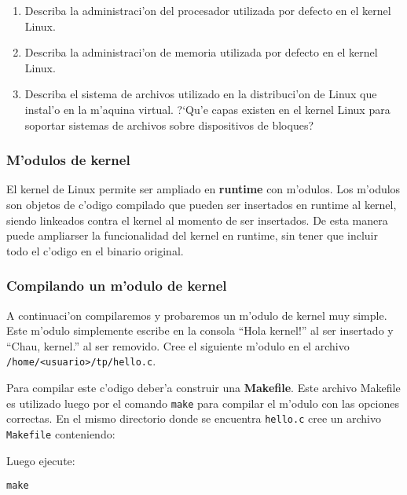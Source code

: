 \begin{enumerate}

\item Describa la administraci'on del procesador utilizada por defecto en el kernel Linux.

\item Describa la administraci'on de memoria utilizada por defecto en el kernel Linux.

\item Describa el sistema de archivos utilizado en la distribuci'on de Linux que instal'o en la m'aquina virtual.
?`Qu'e capas existen en el kernel Linux para soportar sistemas de archivos sobre dispositivos de bloques?

\end{enumerate}

\subsubsection{M'odulos de kernel}

El kernel de Linux permite ser ampliado en \textbf{runtime} con m'odulos. Los m'odulos son objetos de c'odigo compilado
que pueden ser insertados en runtime al kernel, siendo linkeados contra el kernel al momento de ser insertados. De esta
manera puede ampliarser la funcionalidad del kernel en runtime, sin tener que incluir todo el c'odigo en el binario
original.

\subsubsection{Compilando un m'odulo de kernel}

A continuaci'on compilaremos y probaremos un m'odulo de kernel muy simple. Este m'odulo simplemente escribe en la consola
``Hola kernel!'' al ser insertado y ``Chau, kernel.'' al ser removido. Cree el siguiente m'odulo en el archivo
\texttt{/home/<usuario>/tp/hello.c}.


Para compilar este c'odigo deber'a construir una \textbf{Makefile}. Este archivo Makefile es utilizado luego por el
comando \texttt{make} para compilar el m'odulo con las opciones correctas. En el mismo directorio donde se encuentra
\texttt{hello.c} cree un archivo \texttt{Makefile} conteniendo:


Luego ejecute:

\texttt{make}

